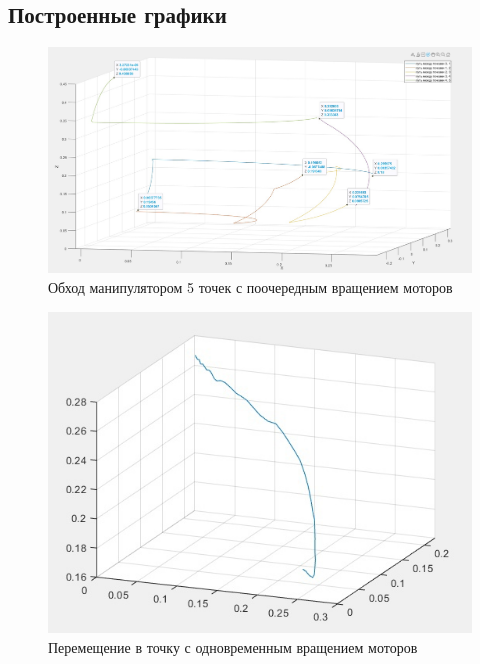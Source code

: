 \documentclass{article}
\begin{document}
\subsection{Построенные графики}
\begin{figure}[h!]
    \centering
    \includegraphics[width=500 pt]{travel_1.jpg}
    \caption{Обход манипулятором 5 точек с поочередным вращением моторов}
\end{figure}
\FloatBarrier
\begin{figure}[h!]
    \centering
    \includegraphics[width=300 pt]{travel_2.jpg}
    \caption{Перемещение в точку с одновременным вращением моторов}
\end{figure}
\FloatBarrier
\end{document}
